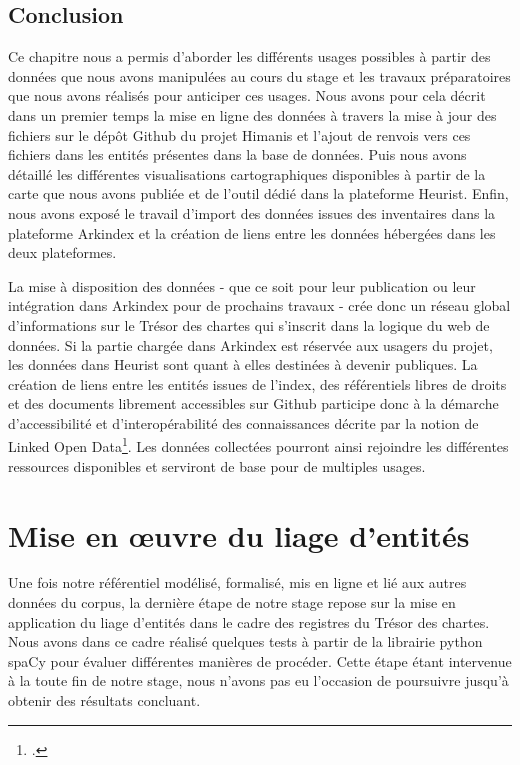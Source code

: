 \documentclass[a4paper,12pt,twoside]{book}
\begin{document}
	\section*{Conclusion}
	
	Ce chapitre nous a permis d'aborder les différents usages possibles à partir des données que nous avons manipulées au cours du stage et les travaux préparatoires que nous avons réalisés pour anticiper ces usages. Nous avons pour cela décrit dans un premier temps la mise en ligne des données à travers la mise à jour des fichiers sur le dépôt Github du projet Himanis et l'ajout de renvois vers ces fichiers dans les entités présentes dans la base de données. Puis nous avons détaillé les différentes visualisations cartographiques disponibles à partir de la carte que nous avons publiée et de l'outil dédié dans la plateforme Heurist. Enfin, nous avons exposé le travail d'import des données issues des inventaires dans la plateforme Arkindex et la création de liens entre les données hébergées dans les deux plateformes.
	
	La mise à disposition des données - que ce soit pour leur publication ou leur intégration dans Arkindex pour de prochains travaux - crée donc un réseau global d'informations sur le Trésor des chartes qui s'inscrit dans la logique du web de données. Si la partie chargée dans Arkindex est réservée aux usagers du projet, les données dans Heurist sont quant à elles destinées à devenir publiques. La création de liens entre les entités issues de l'index, des référentiels libres de droits et des documents librement accessibles sur Github participe donc à la démarche d'accessibilité et d'interopérabilité des connaissances décrite par la notion de Linked Open Data\footcite{hugi_vous_2013}. Les données collectées pourront ainsi rejoindre les différentes ressources disponibles et serviront de base pour de multiples usages.
	
	\chapter{Mise en œuvre du liage d'entités}
	
	Une fois notre référentiel modélisé, formalisé, mis en ligne et lié aux autres données du corpus, la dernière étape de notre stage repose sur la mise en application du liage d'entités dans le cadre des registres du Trésor des chartes. Nous avons dans ce cadre réalisé quelques tests à partir de la librairie python spaCy pour évaluer différentes manières de procéder. Cette étape étant intervenue à la toute fin de notre stage, nous n'avons pas eu l'occasion de poursuivre jusqu'à obtenir des résultats concluant.
	
\end{document}

